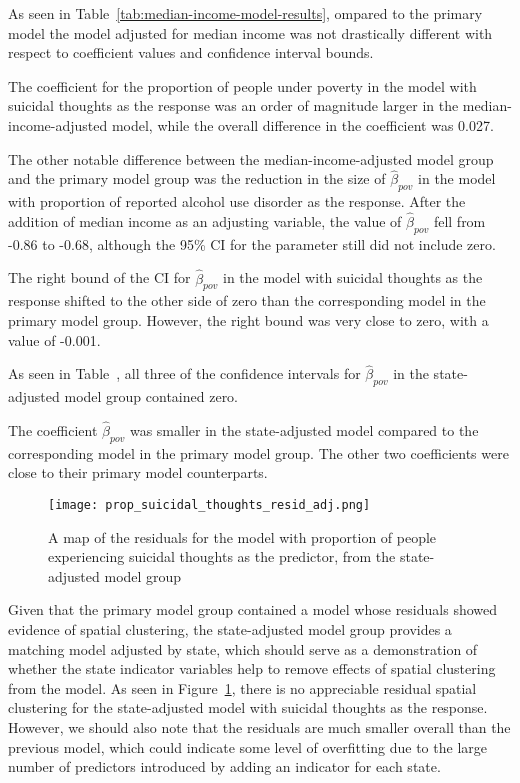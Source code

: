 \documentclass{article}
\begin{document}
As seen in Table~\ref{tab:median-income-model-results},
ompared to the primary model the model adjusted for median income
was not drastically different with respect to coefficient values and
confidence interval bounds.

The coefficient for the proportion of people under
poverty in the model with suicidal thoughts as the response
was an order of magnitude larger in the median-income-adjusted model,
while the overall difference in the coefficient was 0.027.

The other notable difference between
the median-income-adjusted model group and the
primary model group was the reduction in the
size of $\hat{\beta}_{pov}$ in the model with
proportion of reported alcohol use disorder as the response.
After the addition of median income as an adjusting variable,
the value of $\hat{\beta}_{pov}$ fell from -0.86 to -0.68,
although the 95\% CI for the parameter still did not include zero.

The right bound of the CI for $\hat{\beta}_{pov}$ in the
model with suicidal thoughts as the response
shifted to the other side of zero than the corresponding model
in the primary model group.
However, the right bound was very close to zero,
with a value of -0.001.

As seen in Table~\label{tab:state-ind-model-results},
all three of the confidence intervals for
$\hat{\beta}_{pov}$ in the state-adjusted model group contained zero.

The coefficient $\hat{\beta}_{pov}$ was smaller
in the state-adjusted model compared to the
corresponding model in the
primary model group.
The other two coefficients were close to their
primary model counterparts.

\begin{figure}[!htb]
    \centering
    \texttt{[image: prop\_suicidal\_thoughts\_resid\_adj.png]}
    \caption{\label{fig:map-resid-adj-suicidal-thoughts}A map of the residuals
    for the model with
    proportion of people experiencing
    suicidal thoughts as the predictor,
    from the state-adjusted model group
    }
\end{figure}

Given that the primary model group contained
a model whose residuals showed evidence of spatial clustering,
the state-adjusted model group provides a matching
model adjusted by state,
which should serve as a demonstration of whether
the state indicator variables help to remove
effects of spatial clustering from the model.
As seen in Figure~\ref{fig:map-resid-adj-suicidal-thoughts},
there is no appreciable residual spatial clustering
for the state-adjusted model with
suicidal thoughts as the response.
However, we should also note that the residuals
are much smaller overall than the previous model,
which could indicate some level of overfitting due
to the large number of predictors
introduced by adding an indicator for each state.
\end{document}
